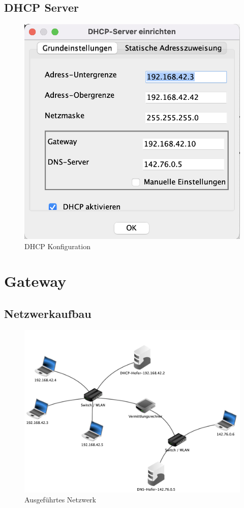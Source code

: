 \documentclass{article}
\begin{document}
	\subsection{DHCP Server}
	\begin{figure}[H]
	\centering
	\includegraphics[scale=0.5]{1.3.png}
	\caption{DHCP Konfiguration}
	\end{figure}
	\section{Gateway}
	\subsection{Netzwerkaufbau}
	\begin{figure}[H]
	\centering
	\includegraphics[scale=0.4]{3.1.png}
	\caption{Ausgeführtes Netzwerk}
	\end{figure}
\end{document}
